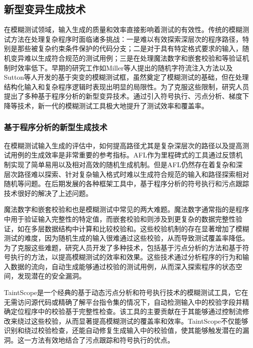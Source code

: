 \documentclass[10.5pt,compsoc]{CjC}
\theoremstyle{mystyle}
\begin{document}
\subsection{新型变异生成技术}

在模糊测试领域，输入生成的质量和效率直接影响着测试的有效性。传统的模糊测试方法在处理复杂程序时面临诸多挑战：一是难以有效探索深层次的程序路径，特别是那些被复杂约束条件保护的代码分支；二是对于具有特定格式要求的输入，随机变异难以生成符合规范的测试用例；三是在处理魔法数字和嵌套校验和等验证机制时效率低下。早期的研究工作如Miller等人提出的随机字符流注入方法\cite{Miller}以及Sutton等人开发的基于突变的模糊测试框\cite{Sutton}，虽然奠定了模糊测试的基础，但在处理结构化输入和复杂程序逻辑时表现出明显的局限性。为了克服这些限制，研究人员提出了多种基于程序分析的新型变异技术。通过引入符号执行、污点分析、梯度下降等技术，新一代的模糊测试工具极大地提升了测试效率和覆盖率。

\vspace{10mm}

\subsubsection{基于程序分析的新型生成技术}
在模糊测试输入生成的评估中，如何提高路径尤其是复杂深层次的路径以及提高测试用例的生成效率是非常重要的参考指标。AFL作为里程碑式的工具通过反馈机制实现了简单易用以及相对高效的随机生成机制。但是AFL仍然存在着复杂和深层次路径难以探索、针对复杂输入格式时难以生成符合规范的输入和路径探索相对随机等问题。在后期发展的各种框架工具中，基于程序分析的符号执行和污点跟踪技术很好的解决了上述问题。

魔法数字和嵌套校验和也是模糊测试中常见的两大难题。魔法数字通常指的是程序中用于验证输入完整性的特定值，而嵌套校验和则涉及到更复杂的数据完整性验证，如在多层数据结构中计算和比较校验和。这些校验机制的存在显著增加了模糊测试的难度，因为随机生成的输入很难通过这些校验，从而导致测试覆盖率降低。为了克服这些难题，研究人员开发了多种技术，包括基于污点分析的方法和基于符号执行的方法，以提高模糊测试的效率和效果。这些技术通过分析程序的行为和输入数据的流向，自动生成能够通过校验的测试用例，从而深入探索程序的状态空间，发现潜在的安全漏洞。

TaintScope\cite{TaintScope}是一个经典的基于动态污点分析和符号执行技术的模糊测试工具，它在无需访问源代码或精确了解平台指令集的情况下，自动检测输入中的校验字段并精确定位程序中的校验基于完整性检查。该工具的主要贡献在于其能够通过控制流修改来绕过这些校验，从而显著提高模糊测试的覆盖率和效率。TaintScope不仅能够识别和绕过校验检查，还能自动修复生成输入中的校验值，使其能够触发潜在的漏洞。这一方法有效地结合了污点跟踪和符号执行的优点。
\end{document}
